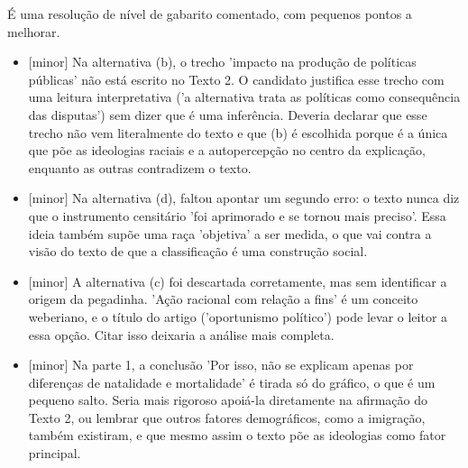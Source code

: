 \documentclass{article}%
\begin{document}
É uma resolução de nível de gabarito comentado, com pequenos pontos a melhorar.%
\begin{itemize}%
\item%
{[}minor{]} Na alternativa (b), o trecho 'impacto na produção de políticas públicas' não está escrito no Texto 2. O candidato justifica esse trecho com uma leitura interpretativa ('a alternativa trata as políticas como consequência das disputas') sem dizer que é uma inferência. Deveria declarar que esse trecho não vem literalmente do texto e que (b) é escolhida porque é a única que põe as ideologias raciais e a autopercepção no centro da explicação, enquanto as outras contradizem o texto.%
\item%
{[}minor{]} Na alternativa (d), faltou apontar um segundo erro: o texto nunca diz que o instrumento censitário 'foi aprimorado e se tornou mais preciso'. Essa ideia também supõe uma raça 'objetiva' a ser medida, o que vai contra a visão do texto de que a classificação é uma construção social.%
\item%
{[}minor{]} A alternativa (c) foi descartada corretamente, mas sem identificar a origem da pegadinha. 'Ação racional com relação a fins' é um conceito weberiano, e o título do artigo ('oportunismo político') pode levar o leitor a essa opção. Citar isso deixaria a análise mais completa.%
\item%
{[}minor{]} Na parte 1, a conclusão 'Por isso, não se explicam apenas por diferenças de natalidade e mortalidade' é tirada só do gráfico, o que é um pequeno salto. Seria mais rigoroso apoiá{-}la diretamente na afirmação do Texto 2, ou lembrar que outros fatores demográficos, como a imigração, também existiram, e que mesmo assim o texto põe as ideologias como fator principal.%
\end{itemize}%
\end{document}

